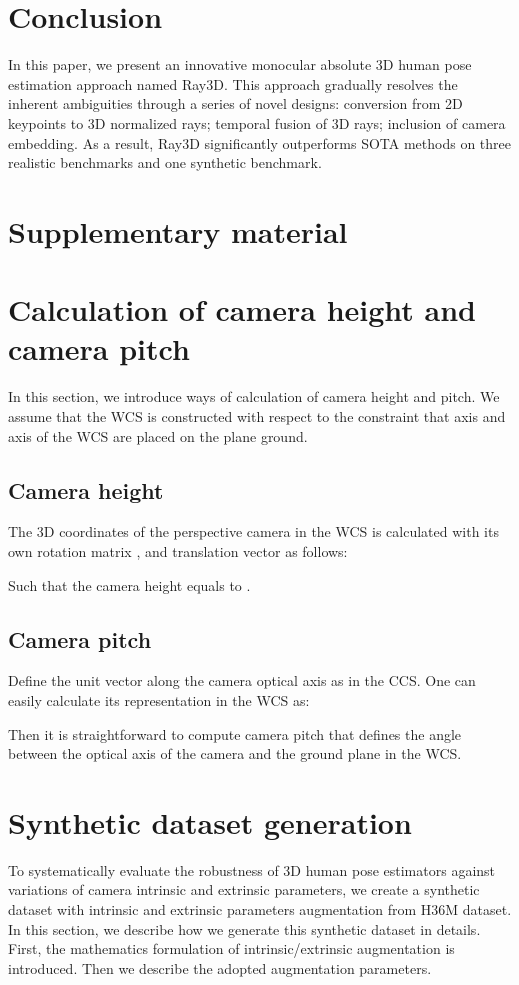 \documentclass[10pt,twocolumn,letterpaper]{article}
\begin{document}
\section{Conclusion}
In this paper, we present an innovative monocular absolute  3D human pose estimation approach named Ray3D. This approach gradually resolves the inherent ambiguities through a series of novel designs: conversion from 2D keypoints to 3D normalized rays; temporal fusion of 3D rays; inclusion of camera embedding. As a result, Ray3D significantly outperforms SOTA methods on three realistic benchmarks and one synthetic benchmark. 

\clearpage
{\small


}

\clearpage
\appendix   


\section*{Supplementary material}

\section{Calculation of camera height and camera pitch}
In this section, we introduce ways of calculation of camera height and pitch. We assume that the WCS is constructed with respect to the constraint that axis  and axis  of the WCS are placed on the plane ground. 

\subsection*{Camera height}
The 3D coordinates of the perspective camera  in the WCS is calculated with its own rotation matrix , and translation vector  as follows: 

Such that the camera height equals to . 

\subsection*{Camera pitch}
Define the unit vector along the camera optical axis as  in the CCS. One can easily calculate its representation  in the WCS as: 

Then  it is straightforward to compute camera pitch  that defines the angle between the optical axis of the camera and the ground plane in the WCS.


\section{Synthetic dataset generation}
\label{sec:augmentation}
To systematically evaluate the robustness of 3D human pose estimators against variations of camera intrinsic and extrinsic parameters, we create a synthetic dataset with intrinsic and extrinsic parameters augmentation from H36M dataset. In this section, we describe how we generate this synthetic dataset in details. First, the mathematics formulation of intrinsic/extrinsic augmentation is introduced. Then we describe the adopted augmentation parameters.  
\end{document}

